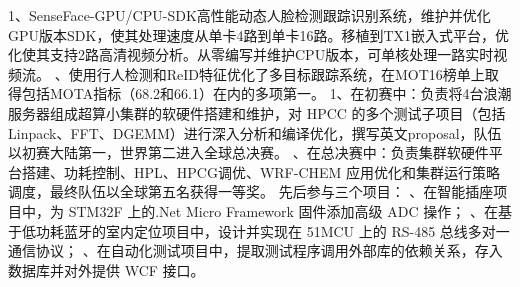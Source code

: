 \documentclass[11pt,a4paper]{moderncv}
\begin{document}
{
1、SenseFace-GPU/CPU-SDK高性能动态人脸检测跟踪识别系统，维护并优化GPU版本SDK，使其处理速度从单卡4路到单卡16路。移植到TX1嵌入式平台，优化使其支持2路高清视频分析。从零编写并维护CPU版本，可单核处理一路实时视频流。
、使用行人检测和ReID特征优化了多目标跟踪系统，在MOT16榜单上取得包括MOTA指标（68.2和66.1）在内的多项第一。
}
{
1、在初赛中：负责将4台浪潮服务器组成超算小集群的软硬件搭建和维护，对 HPCC 的多个测试子项目（包括 Linpack、FFT、DGEMM）进行深入分析和编译优化，撰写英文proposal，队伍以初赛大陆第一，世界第二进入全球总决赛。
、在总决赛中：负责集群软硬件平台搭建、功耗控制、HPL、HPCG调优、WRF-CHEM 应用优化和集群运行策略调度，最终队伍以全球第五名获得一等奖。} 
{先后参与三个项目：
、在智能插座项目中，为 STM32F 上的.Net Micro Framework 固件添加高级 ADC 操作；
、在基于低功耗蓝牙的室内定位项目中，设计并实现在 51MCU 上的 RS-485 总线多对一通信协议；
、在自动化测试项目中，提取测试程序调用外部库的依赖关系，存入数据库并对外提供 WCF 接口。} 
\end{document}
